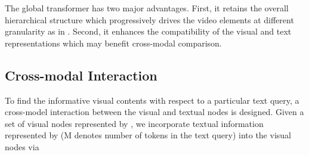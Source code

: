 \documentclass[10pt,journal,compsoc]{IEEEtran}
\begin{document}
The global transformer has two major advantages. First, it retains the overall hierarchical structure which progressively drives the video elements at different granularity as in \cite{xiao2021video}. Second, it enhances the compatibility of the visual and text representations which may benefit cross-modal comparison.
\setlength{\tabcolsep}{9pt}
\begin{table*}[t!]
\small
\centering
\caption{Dataset statistics. OE-1450: open-ended QA with 1450 global answer candidates. MC-5: multi-choice QA with 5 options and only one of them is correct. Note that TGIF-QA-R \cite{peng2021progressive} shares the same statistics with TGIF-QA.}
\label{tab:dset}
\vspace{-0.5em}
\begin{threeparttable}
    \vspace{-0.3cm}
\end{threeparttable}
\end{table*}
\subsection{Cross-modal Interaction}
\label{sec:cm}
To find the informative visual contents with respect to a particular text query, a cross-model interaction between the visual and textual nodes is designed. Given a set of visual nodes represented by , we incorporate textual information represented by  (M denotes number of tokens in the text query) into the visual nodes via
\end{document}
